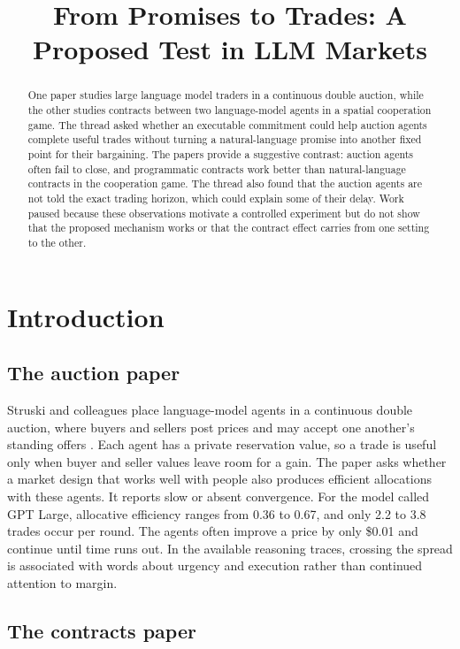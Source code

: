 \documentclass{article}
\title{From Promises to Trades: A Proposed Test in LLM Markets}
\author{}
\date{}
\begin{document}
\maketitle

\begin{abstract}
One paper studies large language model traders in a continuous double auction, while the other studies contracts between two language-model agents in a spatial cooperation game.  The thread asked whether an executable commitment could help auction agents complete useful trades without turning a natural-language promise into another fixed point for their bargaining.  The papers provide a suggestive contrast: auction agents often fail to close, and programmatic contracts work better than natural-language contracts in the cooperation game.  The thread also found that the auction agents are not told the exact trading horizon, which could explain some of their delay.  Work paused because these observations motivate a controlled experiment but do not show that the proposed mechanism works or that the contract effect carries from one setting to the other.
\end{abstract}

\section{Introduction}

\subsection{The auction paper}

Struski and colleagues place language-model agents in a continuous double auction, where buyers and sellers post prices and may accept one another's standing offers \cite{Q}.  Each agent has a private reservation value, so a trade is useful only when buyer and seller values leave room for a gain.  The paper asks whether a market design that works well with people also produces efficient allocations with these agents.  It reports slow or absent convergence.  For the model called GPT Large, allocative efficiency ranges from 0.36 to 0.67, and only 2.2 to 3.8 trades occur per round.  The agents often improve a price by only \$0.01 and continue until time runs out.  In the available reasoning traces, crossing the spread is associated with words about urgency and execution rather than continued attention to margin.

\subsection{The contracts paper}
\end{document}
